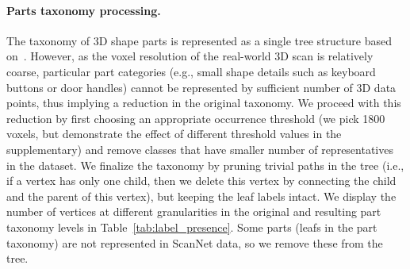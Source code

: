 \paragraph{Parts taxonomy processing. } 
The taxonomy of 3D shape parts is represented as a single tree structure based on~\cite{mo2019partnet}. However, as the voxel resolution of the real-world 3D scan is relatively coarse, particular part categories (e.g., small shape details such as keyboard buttons or door handles) cannot be represented by sufficient number of 3D data points, thus implying a reduction in the original taxonomy. 
We proceed with this reduction by first choosing an appropriate occurrence threshold (we pick 1800 voxels, but demonstrate the effect of different threshold values in the supplementary) and remove classes that have smaller number of representatives in the dataset.
We finalize the taxonomy by pruning trivial paths in the tree (i.e., if a vertex has only one child, then we delete this vertex by connecting the child and the parent of this vertex), but keeping the leaf labels intact. We display the number of vertices at different granularities in the original and resulting part taxonomy levels in Table~\ref{tab:label_presence}.  
Some parts (leafs in the part taxonomy) are not represented in ScanNet data, so we remove these from the tree. 



